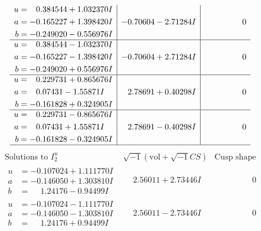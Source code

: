 \documentclass[1p]{elsarticle_modified}
\theoremstyle{definition}
\newcommand{\I}{\sqrt{-1}}
\begin{document}
$$\begin{array}{c|c|c}
\begin{aligned}
u &= \phantom{-}0.384544 + 1.032370 I \\
a &= -0.165227 + 1.398420 I \\
b &= -0.249020 - 0.556976 I\end{aligned}
 & -0.70604 - 2.71284 I & \phantom{-0.000000 } 0 \\ \hline\begin{aligned}
u &= \phantom{-}0.384544 - 1.032370 I \\
a &= -0.165227 - 1.398420 I \\
b &= -0.249020 + 0.556976 I\end{aligned}
 & -0.70604 + 2.71284 I & \phantom{-0.000000 } 0 \\ \hline\begin{aligned}
u &= \phantom{-}0.229731 + 0.865676 I \\
a &= \phantom{-}0.07431 - 1.55871 I \\
b &= -0.161828 + 0.324905 I\end{aligned}
 & \phantom{-}2.78691 + 0.40298 I & \phantom{-0.000000 } 0 \\ \hline\begin{aligned}
u &= \phantom{-}0.229731 - 0.865676 I \\
a &= \phantom{-}0.07431 + 1.55871 I \\
b &= -0.161828 - 0.324905 I\end{aligned}
 & \phantom{-}2.78691 - 0.40298 I & \phantom{-0.000000 } 0\\
 \hline 
 \end{array}$$\newpage$$\begin{array}{c|c|c}  
\text{Solutions to }I^u_{2}& \I (\text{vol} + \sqrt{-1}CS) & \text{Cusp shape}\\
 \hline 
\begin{aligned}
u &= -0.107024 + 1.111770 I \\
a &= -0.146050 + 1.303810 I \\
b &= \phantom{-}1.24176 - 0.94499 I\end{aligned}
 & \phantom{-}2.56011 + 2.73446 I & \phantom{-0.000000 } 0 \\ \hline\begin{aligned}
u &= -0.107024 - 1.111770 I \\
a &= -0.146050 - 1.303810 I \\
b &= \phantom{-}1.24176 + 0.94499 I\end{aligned}
 & \phantom{-}2.56011 - 2.73446 I & \phantom{-0.000000 } 0 \\ \hline\begin{aligned}

\end{aligned}
\end{array}$$
\end{document}
